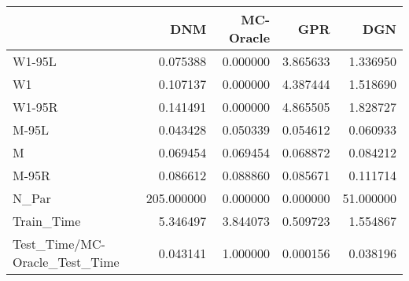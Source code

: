 \begin{tabular}{lrrrr}
\toprule
{} &         DNM &  MC-Oracle &       GPR &        DGN \\
\midrule
W1-95L                        &    0.075388 &   0.000000 &  3.865633 &   1.336950 \\
W1                            &    0.107137 &   0.000000 &  4.387444 &   1.518690 \\
W1-95R                        &    0.141491 &   0.000000 &  4.865505 &   1.828727 \\
M-95L                         &    0.043428 &   0.050339 &  0.054612 &   0.060933 \\
M                             &    0.069454 &   0.069454 &  0.068872 &   0.084212 \\
M-95R                         &    0.086612 &   0.088860 &  0.085671 &   0.111714 \\
N\_Par                         &  205.000000 &   0.000000 &  0.000000 &  51.000000 \\
Train\_Time                    &    5.346497 &   3.844073 &  0.509723 &   1.554867 \\
Test\_Time/MC-Oracle\_Test\_Time &    0.043141 &   1.000000 &  0.000156 &   0.038196 \\
\bottomrule
\end{tabular}

